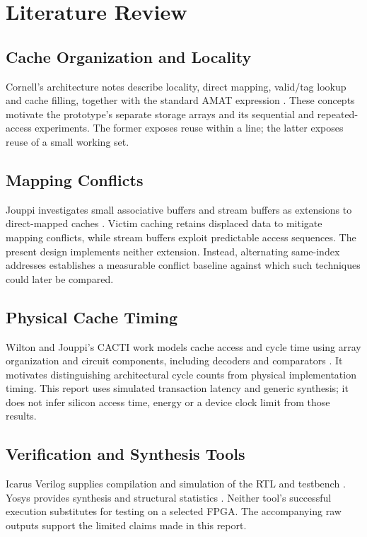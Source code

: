 \documentclass[conference]{IEEEtran}
\begin{document}
\section{Literature Review}
\subsection{Cache Organization and Locality}
Cornell's architecture notes describe locality, direct mapping, valid/tag
lookup and cache filling, together with the standard AMAT expression
\cite{cornell}. These concepts motivate the prototype's separate storage
arrays and its sequential and repeated-access experiments. The former exposes
reuse within a line; the latter exposes reuse of a small working set.

\subsection{Mapping Conflicts}
Jouppi investigates small associative buffers and stream buffers as extensions
to direct-mapped caches \cite{jouppi}. Victim caching retains displaced data
to mitigate mapping conflicts, while stream buffers exploit predictable
access sequences. The present design implements neither extension. Instead,
alternating same-index addresses establishes a measurable conflict baseline
against which such techniques could later be compared.

\subsection{Physical Cache Timing}
Wilton and Jouppi's CACTI work models cache access and cycle time using array
organization and circuit components, including decoders and comparators
\cite{cacti}. It motivates distinguishing architectural cycle counts from
physical implementation timing. This report uses simulated transaction latency
and generic synthesis; it does not infer silicon access time, energy or a
device clock limit from those results.

\subsection{Verification and Synthesis Tools}
Icarus Verilog supplies compilation and simulation of the RTL and testbench
\cite{icarus}. Yosys provides synthesis and structural statistics
\cite{yosys}. Neither tool's successful execution substitutes for testing
on a selected FPGA. The accompanying raw outputs support the limited claims
made in this report.
\end{document}
